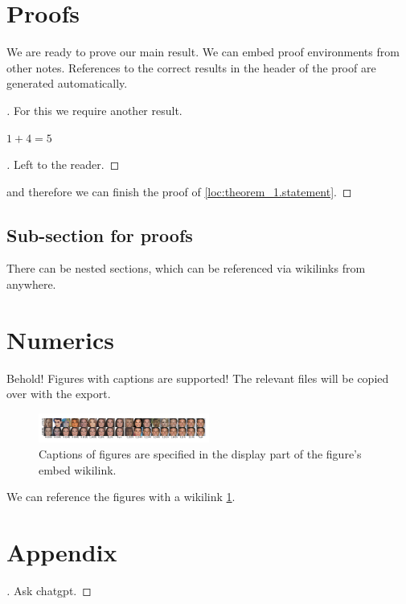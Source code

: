 \documentclass{article}
\begin{document}
\section{Proofs}
\label{loc:body.proofs}
We are ready to prove our main result. We can embed proof environments from other notes. References to the correct results in the header of the proof are generated automatically.
\begin{proof}[\hypertarget{loc:theorem_1.proof}Proof of \cref{loc:theorem_1.statement}]
For this we require another result.
\begin{proposition}
\label{loc:lemma_2.statement}
$1+4 = 5$
\end{proposition}
\begin{proof}[\hypertarget{loc:lemma_2.proof}Proof of \cref{loc:lemma_2.statement}]
Left to the reader.
\end{proof}
and therefore we can finish the proof of \cref{loc:theorem_1.statement}.
\end{proof}
\subsection{Sub-section for proofs}
\label{loc:body.proofs.sub:section_for_proofs}
There can be nested sections, which can be referenced via wikilinks from anywhere.
\section{Numerics}
\label{loc:body.numerics}
Behold! Figures with captions are supported! The relevant files will be copied over with the export.
\begin{figure}[h]
\centering
\includegraphics[width=0.5\textwidth]{Files/intro_comp_wlabel.pdf}
\caption{Captions of figures are specified in the display part of the figure's embed wikilink.\label{fig:intro_comp_wlabel.pdf}}
\end{figure}
We can reference the figures with a wikilink \cref{fig:intro_comp_wlabel.pdf}.
\printbibliography
\appendix
\section{Appendix}
\begin{proof}[\hypertarget{loc:lemma_1.proof}Proof of \cref{loc:lemma_1.statement}]
Ask chatgpt.
\end{proof}
\end{document}
